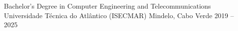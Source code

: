 
\begin{cventries}
  \cventry
    {Bachelor's Degree in Computer Engineering and Telecommunications}
    {Universidade Técnica do Atlântico (ISECMAR)}
    {Mindelo, Cabo Verde}
    {2019 -- 2025}
    {}
\end{cventries}
